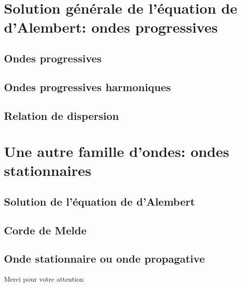 \documentclass[10pt]{beamer}
\begin{document}
\section{Solution générale de l'équation de d'Alembert: ondes progressives}
\subsection{Ondes progressives}
\subsection{Ondes progressives harmoniques}
\subsection{Relation de dispersion}
\section{Une autre famille d'ondes: ondes stationnaires}
\subsection{Solution de l'équation de d'Alembert}
\subsection{Corde de Melde}
\subsection{Onde stationnaire ou onde propagative}
\begin{frame}
    Merci pour votre attention
\end{frame}
\end{document}
